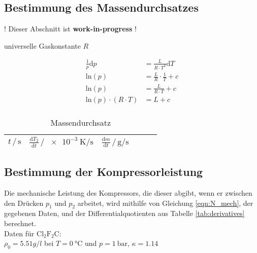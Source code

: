 \subsection{Bestimmung des Massendurchsatzes} %


! Dieser Abschnitt ist \textbf{work-in-progress} !

universelle Gaskonstante $R$

\begin{align*}
  \frac{1}{p} \mathrm{d}p &= \frac{L}{R \cdot T^2} \mathrm{d} T \\
  \mathrm{ln}(p) &= \frac{L}{R} \cdot \frac{1}{T} + c \\
  \mathrm{ln}(p) &= \frac{L}{R \cdot T} + c \\
  \mathrm{ln}(p) \cdot (R \cdot T) &= L + c \\
\end{align*}

\begin{table}
\centering
\caption{Massendurchsatz}
\begin{tabular}{c c c c c c}
\toprule
$t \,/\, \si{\second}$ &
$\frac{\mathrm{d}T_2}{\mathrm{d}t} \,/\, \SI{e-3}{\kelvin\per\second}$ &
$\frac{\mathrm{d}m}{\mathrm{d}t} \,/\, \si{\gram\per\second}$ \\
\midrule

\bottomrule
\end{tabular}
\end{table}


\subsection{Bestimmung der Kompressorleistung} %
Die mechanische Leistung des Kompressors, die dieser abgibt, wenn
er zwischen den Drücken $p_1$ und $p_2$ arbeitet,
wird mithilfe von Gleichung \ref{eqn:N_mech}, der gegebenen Daten, und der Differentialquotienten aus Tabelle \ref{tab:derivatives} berechnet.
\ \\
Daten für $\mathrm{Cl}_2 \mathrm{F}_2 \mathrm{C}$: \\
$ρ_0 = \SI{5.51} g/l$ bei $T = \SI{0}{\celsius}$ und $p = \SI{1}{\bar}$, $κ = 1.14$

